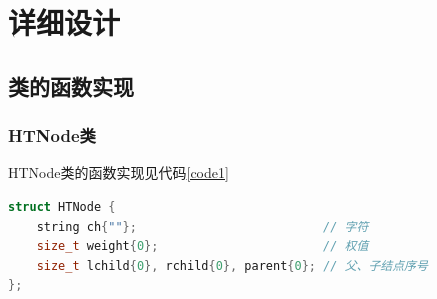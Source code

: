 \documentclass{ctexart}
\begin{document}
    \newpage
    \section{详细设计}
    \subsection{类的函数实现}
    \subsubsection{HTNode类}
    HTNode类的函数实现见代码\ref{code1}
\begin{lstlisting}[language=C++,caption=HTNode类的实现,label=code1]
struct HTNode {
    string ch{""};                          // 字符
    size_t weight{0};                       // 权值
    size_t lchild{0}, rchild{0}, parent{0}; // 父、子结点序号
};
\end{lstlisting}
\end{document}
